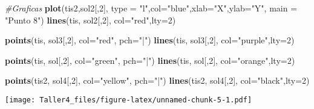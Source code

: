 \documentclass[]{article}
\newenvironment{Shaded}{\begin{snugshade}}{\end{snugshade}}
\newcommand{\KeywordTok}[1]{\textcolor[rgb]{0.13,0.29,0.53}{\textbf{#1}}}
\newcommand{\DataTypeTok}[1]{\textcolor[rgb]{0.13,0.29,0.53}{#1}}
\newcommand{\DecValTok}[1]{\textcolor[rgb]{0.00,0.00,0.81}{#1}}
\newcommand{\StringTok}[1]{\textcolor[rgb]{0.31,0.60,0.02}{#1}}
\newcommand{\CommentTok}[1]{\textcolor[rgb]{0.56,0.35,0.01}{\textit{#1}}}
\newcommand{\NormalTok}[1]{#1}
\begin{document}
\begin{Shaded}
\begin{Highlighting}[]
\CommentTok{#Graficas}
\KeywordTok{plot}\NormalTok{(tis2,sol2[,}\DecValTok{2}\NormalTok{], }\DataTypeTok{type =} \StringTok{"l"}\NormalTok{,}\DataTypeTok{col=}\StringTok{"blue"}\NormalTok{,}\DataTypeTok{xlab=}\StringTok{"X"}\NormalTok{,}\DataTypeTok{ylab=}\StringTok{"Y"}\NormalTok{, }\DataTypeTok{main =} \StringTok{"Punto 8"}\NormalTok{)}
\KeywordTok{lines}\NormalTok{(tis, sol2[,}\DecValTok{2}\NormalTok{], }\DataTypeTok{col=}\StringTok{"red"}\NormalTok{,}\DataTypeTok{lty=}\DecValTok{2}\NormalTok{)}

\KeywordTok{points}\NormalTok{(tis, sol3[,}\DecValTok{2}\NormalTok{], }\DataTypeTok{col=}\StringTok{"red"}\NormalTok{, }\DataTypeTok{pch=}\StringTok{"|"}\NormalTok{)}
\KeywordTok{lines}\NormalTok{(tis, sol3[,}\DecValTok{2}\NormalTok{], }\DataTypeTok{col=}\StringTok{"purple"}\NormalTok{,}\DataTypeTok{lty=}\DecValTok{2}\NormalTok{)}

\KeywordTok{points}\NormalTok{(tis, sol[,}\DecValTok{2}\NormalTok{], }\DataTypeTok{col=}\StringTok{"green"}\NormalTok{, }\DataTypeTok{pch=}\StringTok{"|"}\NormalTok{)}
\KeywordTok{lines}\NormalTok{(tis, sol[,}\DecValTok{2}\NormalTok{], }\DataTypeTok{col=}\StringTok{"orange"}\NormalTok{,}\DataTypeTok{lty=}\DecValTok{2}\NormalTok{)}

\KeywordTok{points}\NormalTok{(tis2, sol4[,}\DecValTok{2}\NormalTok{], }\DataTypeTok{col=}\StringTok{"yellow"}\NormalTok{, }\DataTypeTok{pch=}\StringTok{"|"}\NormalTok{)}
\KeywordTok{lines}\NormalTok{(tis2, sol4[,}\DecValTok{2}\NormalTok{], }\DataTypeTok{col=}\StringTok{"black"}\NormalTok{,}\DataTypeTok{lty=}\DecValTok{2}\NormalTok{)}
\end{Highlighting}
\end{Shaded}

\texttt{[image: Taller4\_files/figure-latex/unnamed-chunk-5-1.pdf]}
\end{document}

